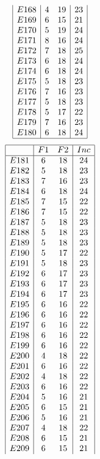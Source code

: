 \documentclass[12pt]{article}
\begin{document}
\begin{multicols}{3}
\begin{equation*}
\begin{array}{|c|cc|c|}
E168&4&19&23\\
E169&6&15&21\\
E170&5&19&24\\
E171&8&16&24\\
E172&7&18&25\\
E173&6&18&24\\
E174&6&18&24\\
E175&5&18&23\\
E176&7&16&23\\
E177&5&18&23\\
E178&5&17&22\\
E179&7&16&23\\
E180&6&18&24\\
\hline
\end{array}
\end{equation*}
\begin{equation*}
\begin{array}{|c|cc|c|}
\hline
&F1&F2&Inc\\
\hline
E181&6&18&24\\
E182&5&18&23\\
E183&7&16&23\\
E184&6&18&24\\
E185&7&15&22\\
E186&7&15&22\\
E187&5&18&23\\
E188&5&18&23\\
E189&5&18&23\\
E190&5&17&22\\
E191&5&18&23\\
E192&6&17&23\\
E193&6&17&23\\
E194&6&17&23\\
E195&6&16&22\\
E196&6&16&22\\
E197&6&16&22\\
E198&6&16&22\\
E199&6&16&22\\
E200&4&18&22\\
E201&6&16&22\\
E202&4&18&22\\
E203&6&16&22\\
E204&5&16&21\\
E205&6&15&21\\
E206&5&16&21\\
E207&4&18&22\\
E208&6&15&21\\
E209&6&15&21\\

\end{array}
\end{equation*}
\end{multicols}
\end{document}

